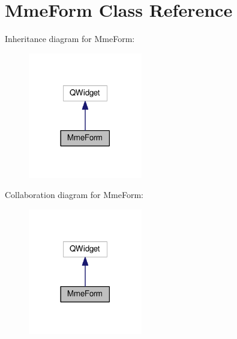 \hypertarget{class_mme_form}{}\section{Mme\+Form Class Reference}
\label{class_mme_form}


Inheritance diagram for Mme\+Form\+:
\nopagebreak
\begin{figure}[H]
\begin{center}
\leavevmode
\includegraphics[width=141pt]{class_mme_form__inherit__graph}
\end{center}
\end{figure}


Collaboration diagram for Mme\+Form\+:
\nopagebreak
\begin{figure}[H]
\begin{center}
\leavevmode
\includegraphics[width=141pt]{class_mme_form__coll__graph}
\end{center}
\end{figure}

